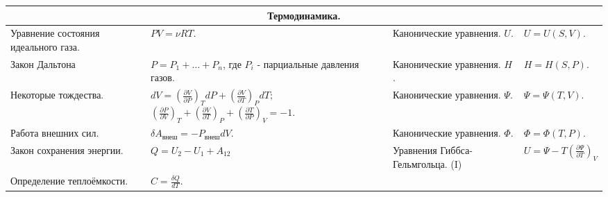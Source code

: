 \documentclass{article}
\begin{document}
\begin{tabular}{ |p{4.5cm}|p{5cm}|p{4.5cm}|p{5cm}|  }
\hline
\multicolumn{4}{|c|}{Термодинамика.} \\
\hline
Уравнение состояния идеального газа.                                         &  %
$PV = \nu RT.$                                                               &  %
Канонические уравнения. $U$.                                                 &  %
$U = U(S, V).$                                                               \\ %
\hline
Закон Дальтона                                                               &  %
$P = P_1 + \dots + P_n$, где ${P_i}$ - парциальные давления газов.           &  %
Канонические уравнения. $H$.                                                 &  %
$H = H(S, P).$                                                               \\ %
\hline
Некоторые тождества.                                                         &  %
$
dV = 
\left( \frac{\partial V}{\partial P} \right)_T dP +
\left( \frac{\partial V}{\partial T} \right)_P dT;
$
$
\left( \frac{\partial P}{\partial V} \right)_T +
\left( \frac{\partial V}{\partial T} \right)_P +
\left( \frac{\partial T}{\partial P} \right)_V = -1.
$                                                                            &  %
Канонические уравнения. $\Psi$.                                              &  %
$\Psi = \Psi(T, V).$                                                         \\ %
\hline
Работа внешних сил.                                                          &  %
$\delta A_\text{внеш} = -P_\text{внеш} dV.$                                  &  %
Канонические уравнения. $\Phi$.                                              &  %
$\Phi = \Phi(T, P).$                                                         \\ %
\hline
Закон сохранения энергии.                                                    &  %
$Q = U_2 - U_1 + A_{12}$                                                     &  %
Уравнения Гиббса-Гельмгольца. (I)                                            &  %
$U = \Psi - T \left( \frac{\partial \Psi}{\partial T} \right)_V$             \\ %
\hline
Определение теплоёмкости.                                                    &  %
$C = \frac{\delta Q}{dT}.$                                                   &  %

\end{tabular}
\end{document}
